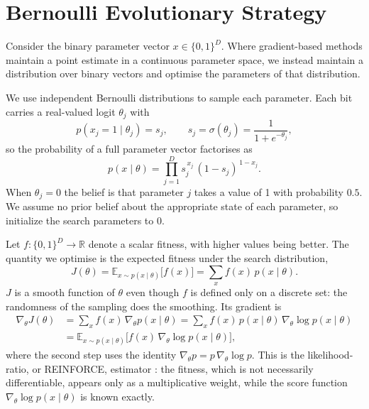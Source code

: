 \documentclass[runningheads]{llncs}
\begin{document}
\section{Bernoulli Evolutionary Strategy}
\label{sec:BES}

Consider the binary parameter vector $x \in \{0,1\}^{D}$. Where gradient-based methods maintain a point
estimate in a continuous parameter space, we instead maintain a
distribution over binary vectors and optimise the parameters of that
distribution.

We use independent Bernoulli distributions to sample each parameter. Each bit carries a real-valued logit $\theta_j$ with
\begin{equation}
p(x_j = 1 \mid \theta_j) = s_j, \qquad
s_j = \sigma(\theta_j) = \frac{1}{1 + e^{-\theta_j}},
\label{eq:bes-bern}
\end{equation}
so the probability of a full parameter vector factorises as
\begin{equation}
p(x \mid \theta) = \prod_{j=1}^{D} s_j^{\,x_j}\,(1-s_j)^{\,1-x_j}.
\label{eq:bes-factor}
\end{equation}
When $\theta_j = 0$ the belief is that parameter $j$ takes a value of 1 with probability $0.5$. We assume no prior belief about the appropriate state of each parameter, so initialize the search parameters to 0.

Let $f : \{0,1\}^D \to \mathbb{R}$ denote a scalar fitness, with higher
values being better. The quantity we optimise is the expected fitness under
the search distribution,
\begin{equation}
J(\theta) = \mathbb{E}_{x \sim p(x \mid \theta)}\bigl[f(x)\bigr]
          = \sum_{x} f(x)\, p(x \mid \theta).
\label{eq:bes-objective}
\end{equation}
$J$ is a smooth function of $\theta$ even though $f$ is defined only on
a discrete set: the randomness of the sampling does the smoothing. Its
gradient is
\begin{align}
\nabla_\theta J(\theta)
  &= \sum_{x} f(x)\, \nabla_\theta p(x \mid \theta)
   = \sum_{x} f(x)\, p(x \mid \theta)\,
     \nabla_\theta \log p(x \mid \theta)
     \nonumber\\
  &= \mathbb{E}_{x \sim p(x \mid \theta)}
     \bigl[f(x)\, \nabla_\theta \log p(x \mid \theta)\bigr],
\label{eq:bes-score}
\end{align}
where the second step uses the identity
$\nabla_\theta p = p\,\nabla_\theta \log p$. This is the
likelihood-ratio, or REINFORCE, estimator
\cite{williams1992simple,bengio2013estimating}: the fitness, which is
not necessarily differentiable, appears only as a multiplicative weight, while the
score function $\nabla_\theta \log p(x \mid \theta)$ is known exactly.
\end{document}

